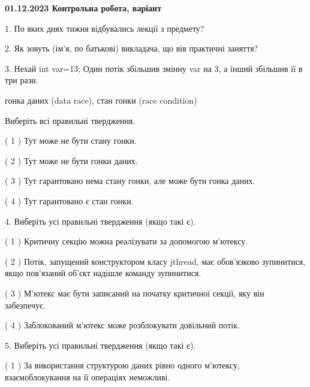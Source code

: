 \documentclass[12pt, ukrainian]{article}
\begin{document}
\vspace{4mm}
\newpage
\begin {large}

\textbf{01.12.2023 Контрольна робота, варіант  }\par


{
1. По яких днях тижня відбувались лекції з предмету?



\vspace{5mm}
2. Як зовуть (ім'я, по батькові) викладача, що вів практичні заняття?



\vspace{5mm}
3. Нехай int var=13; Один потік збільшив змінну var на 3, а інший збільшив її в три рази.

гонка даних (data race), стан гонки (race condition)

Виберіть всі правильні твердження.\par
\vspace{2mm}
( 1 ) Тут може не бути стану гонки.%

( 2 ) Тут може не бути гонки даних.%

( 3 ) Тут гарантовано нема стану гонки, але може бути гонка даних.%

( 4 ) Тут гарантовано є стан гонки.%


\vspace{5mm}
4. Виберіть усі правильні твердження (якщо такі є).\par
\vspace{2mm}

( 1 ) Критичну секцію можна реалізувати за допомогою м’ютексу.%

( 2 ) Потік, запущений конструктором класу jthread, має обов’язково зупинитися, якщо пов’язаний об’єкт надішле команду зупинитися.%

( 3 ) М’ютекс має бути записаний на початку критичної секції, яку він забезпечує.%

( 4 ) Заблокований м’ютекс може розблокувати довільний потік.%


\vspace{5mm}
5. Виберіть усі правильні твердження (якщо такі є).\par
\vspace{2mm}

( 1 ) За використання структурою даних рівно одного м’ютексу, взаємоблокування на її операціях неможливі.%

}
\end{large}
\end{document}
